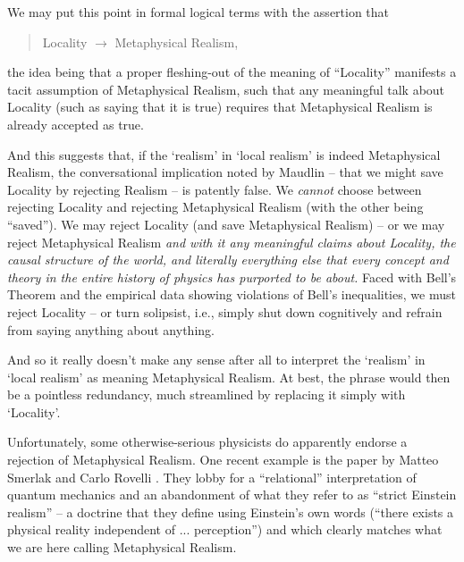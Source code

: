 \documentclass[12pt]{article}
\begin{document}
We may put this point in formal logical terms with the assertion that
\begin{quote}
Locality $\rightarrow$ Metaphysical Realism, 
\end{quote}
the idea being that a proper fleshing-out of the meaning of
``Locality'' manifests a tacit assumption of Metaphysical Realism,
such that any meaningful talk about Locality (such as saying that it
is true) requires that 
Metaphysical Realism is already accepted as true.  

And this suggests that, if the `realism' in `local realism' is indeed
Metaphysical Realism, the conversational implication noted by Maudlin
-- that we might save Locality by rejecting Realism -- is
patently false.  We \emph{cannot} choose between rejecting Locality and 
rejecting Metaphysical Realism (with the other being ``saved'').  We
may reject Locality (and save Metaphysical Realism) -- or we may reject
Metaphysical Realism \emph{and with it any meaningful claims about
  Locality, the causal structure of the world, and literally
  everything else that every concept and theory in the entire history
  of physics has purported to be about.}  Faced with
Bell's Theorem and the empirical data showing violations of Bell's
inequalities, we must reject Locality -- or turn solipsist, i.e.,
simply shut down
cognitively and refrain from saying anything about anything.  

And so it really doesn't make any sense after all to interpret the
`realism' in `local realism' as meaning Metaphysical Realism.  At
best, the phrase would then be a pointless redundancy, much
streamlined by replacing it simply with `Locality'.  

Unfortunately, some otherwise-serious physicists do apparently
endorse a rejection of Metaphysical Realism.  One recent
example is the paper by Matteo Smerlak and Carlo Rovelli \cite{rovelli}.   
They lobby for a ``relational'' interpretation of quantum mechanics
and an abandonment of what they refer to as ``strict Einstein
realism'' -- a doctrine that they define using Einstein's own words
(``there exists a physical reality independent of ... perception'')
and which clearly matches what we are here calling Metaphysical
Realism.  
\end{document}
